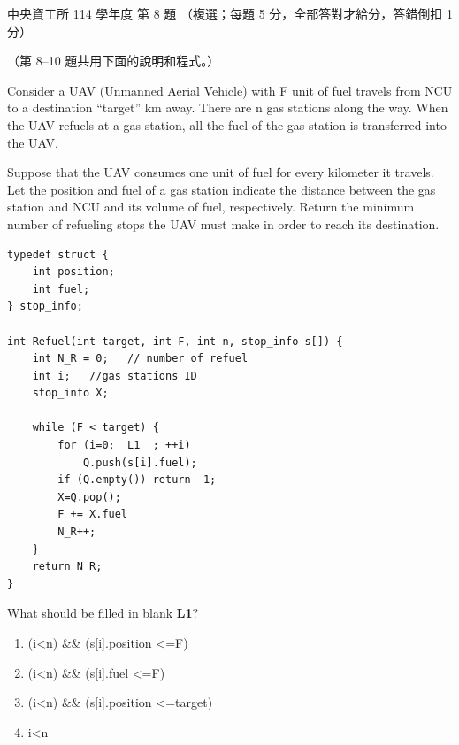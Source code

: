 \begin{pastexam}[label={px:ncu-114-dsa-08}]{中央資工所 114 學年度 第 8 題}
（複選；每題 5 分，全部答對才給分，答錯倒扣 1 分）

（第 8--10 題共用下面的說明和程式。）

Consider a UAV (Unmanned Aerial Vehicle) with F unit of fuel travels from NCU to a destination
``target'' km away. There are n gas stations along the way. When the UAV refuels at a gas station, all
the fuel of the gas station is transferred into the UAV.

Suppose that the UAV consumes one unit of fuel for every kilometer it travels. Let the position and fuel
of a gas station indicate the distance between the gas station and NCU and its volume of fuel,
respectively. Return the minimum number of refueling stops the UAV must make in order to reach its
destination.
\begin{verbatim}
typedef struct {
    int position;
    int fuel;
} stop_info;

int Refuel(int target, int F, int n, stop_info s[]) {
    int N_R = 0;   // number of refuel
    int i;   //gas stations ID
    stop_info X;

    while (F < target) {
        for (i=0;  L1  ; ++i)
            Q.push(s[i].fuel);
        if (Q.empty()) return -1;
        X=Q.pop();
        F += X.fuel
        N_R++;
    }
    return N_R;
}
\end{verbatim}

What should be filled in blank \textbf{L1}?
\begin{enumerate}[label=(\alph*)]
\item (i<n) \&\& (s[i].position <=F)
\item (i<n) \&\& (s[i].fuel <=F)
\item (i<n) \&\& (s[i].position <=target)
\item i<n
\end{enumerate}
\end{pastexam}

